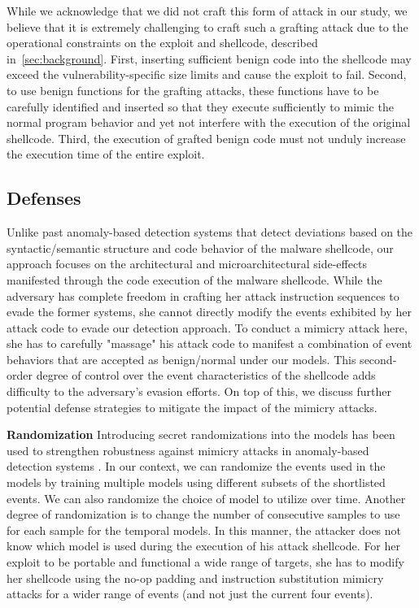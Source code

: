 \documentclass{acm_proc_article-sp}
\begin{document}
While we acknowledge that we did not craft this form of attack in our 
study, we believe that it is extremely challenging to craft
such a grafting attack due to the operational constraints on the 
exploit and shellcode, described in~\ref{sec:background}. 
First, inserting sufficient benign code into 
the shellcode may exceed the vulnerability-specific size limits and
cause the exploit to fail. Second, to use benign functions for the grafting 
attacks, these  functions have to be carefully identified and inserted so that 
they execute sufficiently to mimic the normal program behavior and yet not 
interfere with the execution of the original shellcode. Third, the execution of 
grafted benign code must not unduly increase the execution time of the entire 
exploit.


\subsection{Defenses}

Unlike past anomaly-based detection systems that detect deviations based on the syntactic/semantic structure and code behavior of the malware shellcode, our approach focuses on the architectural and microarchitectural side-effects manifested through the code execution of the malware shellcode. While the adversary has complete freedom in crafting her attack instruction sequences to evade the former systems, she cannot directly modify the events exhibited by her attack code to evade our detection approach. To conduct a mimicry attack here, she has to carefully "massage" his attack code to manifest a combination of event behaviors that are accepted as benign/normal under our models. This second-order degree of control over the event characteristics of the shellcode adds difficulty to the adversary's evasion efforts. On top of this, we discuss further potential defense strategies to mitigate the impact of the mimicry attacks.

\textbf{Randomization} \space\space Introducing secret randomizations into the models has been used to strengthen robustness against mimicry attacks in anomaly-based detection systems \cite{bruschi2007efficient, wang2006anagram}. In our context, we can randomize the events used in the models by training multiple models using different subsets of the shortlisted events. We can also randomize the choice of model to utilize over time. Another degree of randomization is to change the number of consecutive samples to use for each sample for the temporal models. In this manner, the attacker does not know which model is used during the execution of his attack shellcode. For her exploit to be portable and functional a wide range of targets, she has to modify her shellcode using the no-op padding and instruction substitution mimicry attacks for a wider range of events (and not just the current four events).
\end{document}
